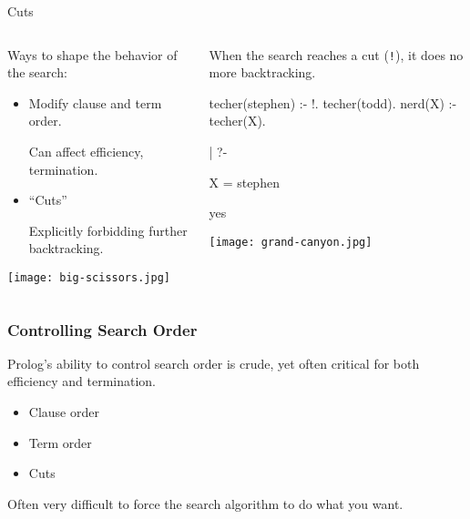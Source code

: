 \documentclass{plt}
\begin{document}
\begin{frame}[fragile]{Cuts}

  \begin{columns}
    \begin{column}{0.5\textwidth}

Ways to shape the behavior of the search:

\begin{itemize}

\item Modify clause and term order.

 Can affect efficiency, termination.

\item ``Cuts''

Explicitly forbidding further backtracking.

\end{itemize}

\texttt{[image: big-scissors.jpg]}

    \end{column}
    \begin{column}{0.5\textwidth}

When the search reaches a cut (\texttt{!}), it does no more
backtracking.

\begin{prolog}
techer(stephen) :- !.
techer(todd).
nerd(X) :- techer(X).
\end{prolog}

\begin{interactive}
| ?- 

X = stephen

yes
\end{interactive}   

\texttt{[image: grand-canyon.jpg]}
    \end{column}
  \end{columns}

\end{frame}

\begin{frame}
  \frametitle{Controlling Search Order}

Prolog's ability to control search order is crude, yet often critical for both efficiency and termination.

\begin{itemize}
\item Clause order

\item Term order

\item Cuts
\end{itemize}

Often very difficult to force the search algorithm to do what you want.

\end{frame}
\end{document}
